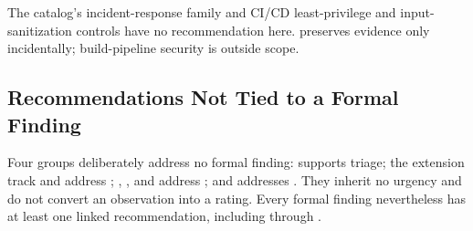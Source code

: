 \documentclass[../main.tex]{subfiles}
\begin{document}
The catalog's incident-response family and CI/CD least-privilege and input-
sanitization controls have no recommendation here.  preserves
evidence only incidentally; build-pipeline security is outside scope.

\subsection{Recommendations Not Tied to a Formal Finding}

Four groups deliberately address no formal finding:  supports
triage; the extension track and  address
; , , and 
address ; and  addresses
. They inherit no urgency and do not convert an observation
into a rating. Every formal finding nevertheless has at least one linked
recommendation, including  through
.
\end{document}
